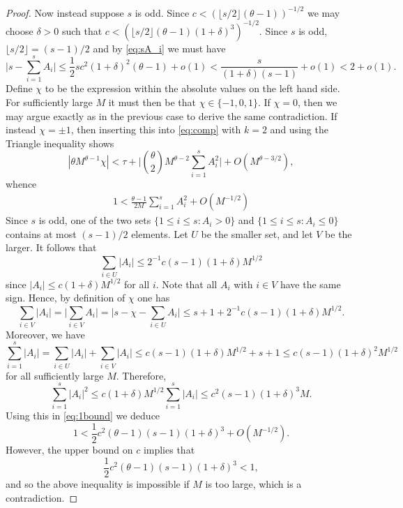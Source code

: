 \documentclass[10pt,a4paper]{amsart}
\begin{document}
\begin{proof}
Now instead suppose $s$ is odd. Since $c < (\lfloor s/2 \rfloor(\theta-1))^{-1/2}$ we may choose $\delta > 0$ such that $c < (\lfloor s/2 \rfloor(\theta-1)(1+\delta)^3)^{-1/2}$. Since $s$ is odd, $\lfloor s/2 \rfloor = (s-1)/2$ and by \eqref{eq:sA_i} we must have 
\[ \Big|s-\sum_{i=1}^s A_i\Big| \leq \frac{1}{2}sc^2(1+\delta)^2(\theta-1)+o(1) < \frac{s}{(1+\delta)(s-1)}+o(1) < 2+o(1). \]
Define $\chi$ to be the expression within the absolute values on the left hand side. For sufficiently large $M$ it must then be that $\chi \in \{ -1, 0 , 1\}$. If $\chi = 0$, then we may argue exactly as in the previous case to derive the same contradiction. If instead $\chi = \pm 1$, then inserting this into \eqref{eq:comp} with $k = 2$ and using the Triangle inequality shows 
\[ |\theta M^{\theta-1}\chi| < \tau +\Big| \binom{\theta}{2} M^{\theta-2} \sum_{i=1}^s A_i^2\Big|+O(M^{\theta-3/2}), \]
whence 
\begin{align} \label{eq:1bound}
1 < \frac{\theta-1}{2M}\sum_{i=1}^sA_i^2+O(M^{-1/2})
\end{align}
Since $s$ is odd, one of the two sets $\{1 \leq i \leq s: A_i > 0\}$ and $\{1 \leq i \leq s :A_i \leq 0\}$ contains at most $(s-1)/2$ elements. Let $U$ be the smaller set, and let $V$ be the larger. It follows that 
\[ \sum_{i \in U} |A_i| \leq 2^{-1}c(s-1)(1+\delta)M^{1/2} \]
since $|A_i| \leq c(1+\delta)M^{1/2}$ for all $i$. Note that all $A_i$ with $i \in V$ have the same sign. Hence, by definition of $\chi$ one has 
\[ \sum_{i \in V} |A_i| = \big|\sum_{i \in V} A_i\big| = \big|s-\chi-\sum_{i \in U} A_i\big| \leq s+1+2^{-1}c(s-1)(1+\delta)M^{1/2}. \] 
Moreover, we have 
\[ \sum_{i=1}^s |A_i| = \sum_{i \in U} |A_i| +\sum_{i \in V} |A_i| \leq c(s-1)(1+\delta)M^{1/2}+s+1 \leq c(s-1)(1+\delta)^2M^{1/2} \]
for all sufficiently large $M$. Therefore, 
\[ \sum_{i=1}^s |A_i|^2 \leq c(1+\delta)M^{1/2}\sum_{i=1}^s |A_i| \leq c^2(s-1)(1+\delta)^3M. \]
Using this in \eqref{eq:1bound} we deduce 
\[ 1 < \frac{1}{2}c^2(\theta-1)(s-1)(1+\delta)^3+O(M^{-1/2}). \]
However, the upper bound on $c$ implies that 
\[ \frac{1}{2}c^2(\theta-1)(s-1)(1+\delta)^3 < 1, \]
and so the above inequality is impossible if $M$ is too large, which is a contradiction. 
\end{proof} 
\end{document}
